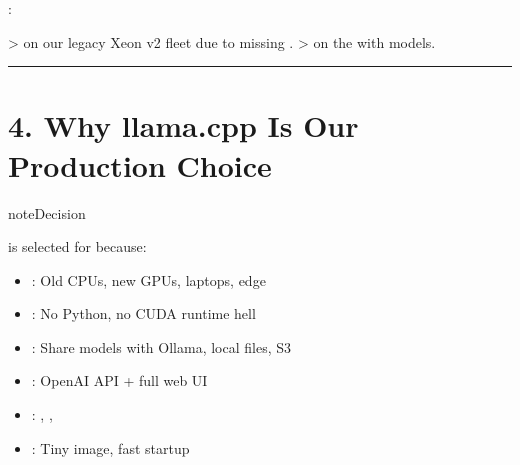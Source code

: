 \documentclass[letterpaper,10pt,english]{sphinxmanual}
\begin{document}
\sphinxAtStartPar
{}:

\sphinxAtStartPar
\textgreater{}  on our legacy Xeon v2 fleet due to missing .
\textgreater{}  on the  with  models.


\bigskip\hrule\bigskip



\section{4. Why llama.cpp Is Our Production Choice}
\label{\detokenize{hybrid:why-llama-cpp-is-our-production-choice}}
\begin{sphinxadmonition}{note}{Decision}

\sphinxAtStartPar
{} is selected for  because:
\begin{itemize}
\item {} 
\sphinxAtStartPar
{}: Old CPUs, new GPUs, laptops, edge

\item {} 
\sphinxAtStartPar
{}: No Python, no CUDA runtime hell

\item {} 
\sphinxAtStartPar
{}: Share models with Ollama, local files, S3

\item {} 
\sphinxAtStartPar
{}: OpenAI API + full web UI

\item {} 
\sphinxAtStartPar
{}: , , 

\item {} 
\sphinxAtStartPar
{}: Tiny image, fast startup

\end{itemize}
\end{sphinxadmonition}
\end{document}
